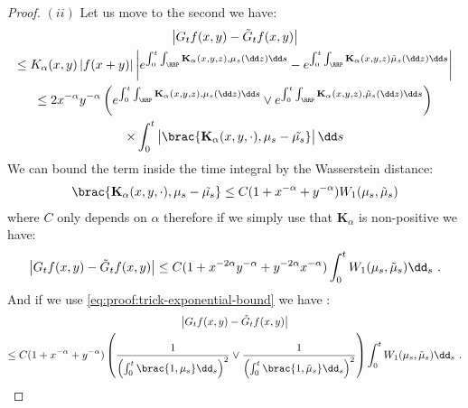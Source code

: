 \begin{proof}
    
    $(ii)$ Let us move to the second we have:
    \begin{multline*}
        \left|\vphantom{A^2} G_tf(x,y) - \tilde{G}_tf(x,y)\right|\\
        \leq K_\alpha(x,y)\left|f(x+y)\right| \left|e^{\int_0^t\int_{\RRP}\mathbf{K}_\alpha(x,y,z),\mu_s(\dd z) \dd s} - e^{\int_0^t\int_{\RRP}\mathbf{K}_\alpha(x,y,z)\tilde{\mu}_s(\dd z) \dd s}\right| \\
        \leq 2x^{-\alpha} y^{-\alpha}\left(e^{\int_0^t\int_{\RRP}\mathbf{K}_\alpha(x,y,z),\mu_s(\dd z) \dd s}\vee e^{\int_0^t\int_{\RRP}\mathbf{K}_\alpha(x,y,z),\tilde{\mu}_s(\dd z) \dd s}  \right)\\
        \times \int_0^t \left|\brac{\vphantom{A^2}\mathbf{K}_\alpha(x,y,\cdot),\mu_s - \tilde{\mu_s}}  \right| \dd s
    \end{multline*}
    We can bound the term inside the time integral by the Wasserstein distance:
    \begin{align*}
        \brac{\vphantom{A^2}\mathbf{K}_\alpha(x,y,\cdot),\mu_s - \tilde{\mu_s}} \leq C(1 + x^{-\alpha} + y^{-\alpha})W_1(\mu_s,\tilde{\mu}_s)
    \end{align*}
    where $C$ only depends on $\alpha$ therefore if we simply use that $\mathbf{K}_\alpha$ is non-positive we have:
    \begin{align*}
        \left|\vphantom{A^2} G_tf(x,y) - \tilde{G}_tf(x,y)\right| \leq C(1 + x^{-2\alpha}y^{-\alpha} + y^{-2\alpha}x^{-\alpha}) \int_0^t W_1(\mu_s,\tilde{\mu}_s) \dd_s\ .
    \end{align*}
    And if we use \eqref{eq:proof:trick-exponential-bound} we have :
    \begin{multline*}
        \left|\vphantom{A^2} G_tf(x,y) - \tilde{G}_tf(x,y)\right|\\
        \leq C(1 + x^{-\alpha} + y^{-\alpha})  \left(\dfrac{1}{\left(\int_0^t \brac{1,\mu_s} \dd _s\right)^2} \vee \dfrac{1}{\left(\int_0^t \brac{1,\tilde{\mu}_s} \dd _s\right)^2} \right) \int_0^t W_1(\mu_s,\tilde{\mu}_s) \dd_s\ .
    \end{multline*}
\end{proof}

